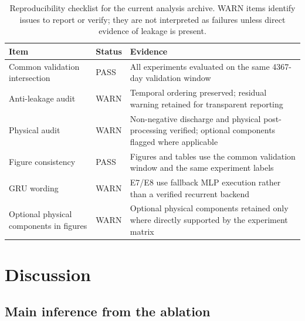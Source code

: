 \documentclass[a4paper,fleqn]{cas-sc}
\begin{document}
\begin{table}
\caption{Reproducibility checklist for the current analysis archive. WARN
items identify issues to report or verify; they are not interpreted as
failures unless direct evidence of leakage is present.}
\label{tab:reproducibility}
\centering
\footnotesize
\begin{tabularx}{\textwidth}{@{}>{\raggedright\arraybackslash}p{}l>{\raggedright\arraybackslash}X@{}}
\toprule
Item & Status & Evidence \\
\midrule
Common validation intersection & PASS
  & All experiments evaluated on the same 4367-day validation window \\
Anti-leakage audit & WARN
  & Temporal ordering preserved; residual warning retained for transparent reporting \\
Physical audit   & WARN
  & Non-negative discharge and physical post-processing verified; optional components flagged where applicable \\
Figure consistency  & PASS
  & Figures and tables use the common validation window and the same experiment labels \\
GRU wording      & WARN
  & E7/E8 use fallback MLP execution rather than a verified recurrent backend \\
Optional physical components in figures & WARN
  & Optional physical components retained only where directly supported by the experiment matrix \\
\bottomrule
\end{tabularx}
\end{table}



\section{Discussion}\label{sec:discussion}

\subsection{Main inference from the ablation}
\label{subsec:discussion-main-inference}
\end{document}
